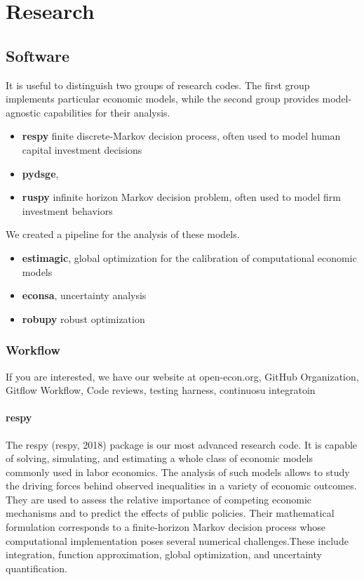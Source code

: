 \section{Research}\label{Transdisciplinary research}




\subsection{Software}

It is useful to distinguish two groups of research codes. The first group implements particular economic models, while the second group provides model-agnostic capabilities for their analysis.

\begin{itemize}
\item \textbf{respy} finite discrete-Markov decision process, often used to model human capital investment decisions
\item \textbf{pydsge},
\item \textbf{ruspy} infinite horizon Markov decision problem, often used to model firm investment behaviors
\end{itemize}

We created a pipeline for the analysis of these models.

\begin{itemize}
\item \textbf{estimagic}, global optimization for the calibration of computational economic models
\item \textbf{econsa}, uncertainty analysis
\item \textbf{robupy} robust optimization
\end{itemize}

\subsubsection*{Workflow}


If you are interested, we have our website at open-econ.org, GitHub Organization, Gitflow Workflow, Code reviews, testing harness, continuosu integratoin


\paragraph{respy} The respy (respy, 2018) package is our most advanced research code. It is capable of solving, simulating, and estimating a whole class of economic models commonly used in labor economics. The analysis of such models allows to study the driving forces behind observed inequalities in a variety of economic outcomes. They are used to assess the relative importance of competing economic mechanisms and to predict the effects of public policies. Their mathematical formulation corresponds to a finite-horizon Markov decision process whose computational implementation poses several numerical challenges.These include integration, function approximation, global optimization, and uncertainty quantification.

